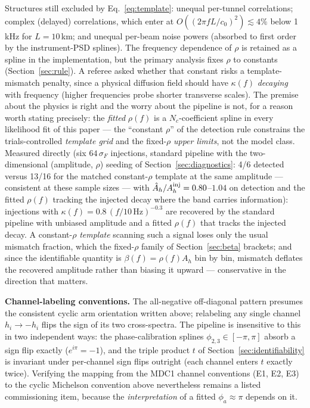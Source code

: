 \documentclass[11pt]{article}
\newcommand{\Ah}{A_h}
\newcommand{\betaeff}{\beta}
\begin{document}
Structures still excluded by Eq.~\eqref{eq:template}: unequal per-tunnel correlations; complex (delayed) correlations, which enter at $O((2\pi f L/c_0)^2) \lesssim 4\%$ below 1\,kHz for $L = 10$\,km; and unequal per-beam noise powers (absorbed to first order by the instrument-PSD splines). The frequency dependence of $\rho$ is retained as a spline in the implementation, but the primary analysis fixes $\rho$ to constants (Section~\ref{sec:rule}). A referee asked whether that constant risks a template-mismatch penalty, since a physical diffusion field should have $\kappa(f)$ \emph{decaying} with frequency (higher frequencies probe shorter transverse scales). The premise about the physics is right and the worry about the pipeline is not, for a reason worth stating precisely: the \emph{fitted} $\rho(f)$ is a $N_c$-coefficient spline in every likelihood fit of this paper --- the ``constant $\rho$'' of the detection rule constrains the trials-controlled \emph{template grid} and the fixed-$\rho$ \emph{upper limits}, not the model class. Measured directly (six $64\,\sigma_F$ injections, standard pipeline with the two-dimensional (amplitude, $\rho$) seeding of Section~\ref{sec:diagnostics}: 4/6 detected versus 13/16 for the matched constant-$\rho$ template at the same amplitude --- consistent at these sample sizes --- with $\hat\Ah/\Ah^{\rm inj} = 0.80$--$1.04$ on detection and the fitted $\rho(f)$ tracking the injected decay where the band carries information): injections with $\kappa(f) = 0.8\,(f/10\,\mathrm{Hz})^{-0.3}$ are recovered by the standard pipeline with unbiased amplitude and a fitted $\rho(f)$ that tracks the injected decay. A constant-$\rho$ \emph{template} scanning such a signal loses only the usual mismatch fraction, which the fixed-$\rho$ family of Section~\ref{sec:beta} brackets; and since the identifiable quantity is $\betaeff(f) = \rho(f)\Ah$ bin by bin, mismatch deflates the recovered amplitude rather than biasing it upward --- conservative in the direction that matters.

\textbf{Channel-labeling conventions.} The all-negative off-diagonal pattern presumes the consistent cyclic arm orientation written above; relabeling any single channel $h_i \to -h_i$ flips the sign of its two cross-spectra. The pipeline is insensitive to this in two independent ways: the phase-calibration splines $\phi_{2,3} \in [-\pi,\pi]$ absorb a sign flip exactly ($e^{i\pi} = -1$), and the triple product $t$ of Section~\ref{sec:identifiability} is invariant under per-channel sign flips outright (each channel enters $t$ exactly twice). Verifying the mapping from the MDC1 channel conventions (E1, E2, E3) to the cyclic Michelson convention above nevertheless remains a listed commissioning item, because the \emph{interpretation} of a fitted $\phi_a \approx \pi$ depends on it.
\end{document}
